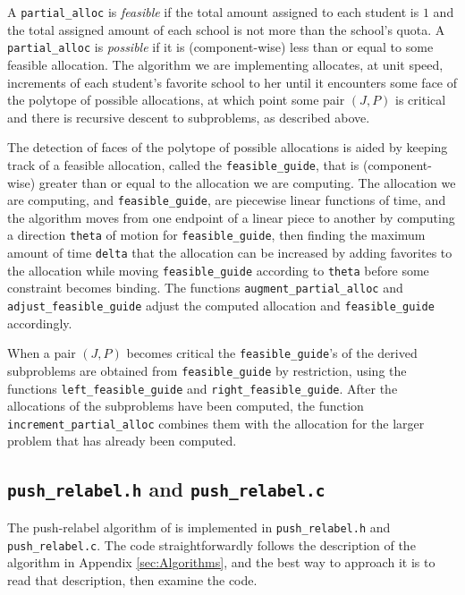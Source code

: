 \documentclass[12pt]{article}
\theoremstyle{definition}
\begin{document}
\begin{appendix}
A \texttt{partial\_alloc} is \emph{feasible} if the total amount
assigned to each student is $1$ and the total assigned amount of each
school is not more than the school's quota.  A \texttt{partial\_alloc}
is \emph{possible} if it is (component-wise) less than or equal to
some feasible allocation.  The algorithm we are implementing
allocates, at unit speed, increments of each student's favorite school
to her until it encounters some face of the polytope of possible
allocations, at which point some pair $(J,P)$ is critical and there is
recursive descent to subproblems, as described above.

The detection of faces of the polytope of possible allocations is
aided by keeping track of a feasible allocation, called the
\texttt{feasible\_guide}, that is (component-wise) greater than or
equal to the allocation we are computing.  The allocation we are
computing, and \texttt{feasible\_guide}, are piecewise linear
functions of time, and the algorithm moves from one endpoint of a
linear piece to another by computing a direction \texttt{theta} of
motion for \texttt{feasible\_guide}, then finding the maximum amount
of time \texttt{delta} that the allocation can be increased by adding
favorites to the allocation while moving \texttt{feasible\_guide}
according to \texttt{theta} before some constraint becomes binding.
The functions \texttt{augment\_partial\_alloc} and
\texttt{adjust\_feasible\_guide} adjust the computed allocation and
\texttt{feasible\_guide} accordingly.

When a pair $(J,P)$ becomes critical the \texttt{feasible\_guide}'s of
the derived subproblems are obtained from \texttt{feasible\_guide} by
restriction, using the functions \texttt{left\_feasible\_guide} and
\texttt{right\_feasible\_guide}.  After the allocations of the
subproblems have been computed, the function
\texttt{increment\_partial\_alloc} combines them with the allocation
for the larger problem that has already been computed.

\subsection{\texttt{push\_relabel.h} and \texttt{push\_relabel.c}}
\label{subsec:PushRelabel}

The push-relabel algorithm of \cite{GoTa88} is implemented in
\texttt{push\_relabel.h} and \texttt{push\_relabel.c}.  The code
straightforwardly follows the description of the algorithm in Appendix
\ref{sec:Algorithms}, and the best way to approach it is to read that
description, then examine the code.


\end{appendix}
\end{document}
